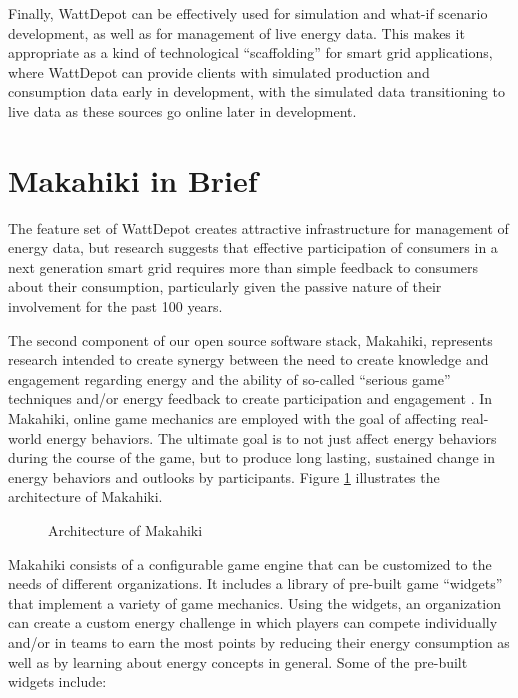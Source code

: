 \documentclass{acm_proc_article-sp}
\begin{document}
Finally, WattDepot can be effectively used for simulation and what-if scenario
development, as well as for management of live energy data.  This makes it appropriate as
a kind of technological ``scaffolding'' for smart grid applications, where WattDepot can
provide clients with simulated production and consumption data early in development, with
the simulated data transitioning to live data as these sources go online later in development.

\section{Makahiki in Brief}

The feature set of WattDepot creates attractive infrastructure for management of energy
data, but research suggests that effective participation of consumers in a next generation
smart grid requires more than simple feedback to consumers about their consumption,
particularly given the passive nature of their involvement for the past 100 years. 

The second component of our open source software stack, Makahiki, represents research
intended to create synergy between the need to create knowledge and engagement regarding
energy and the ability of so-called ``serious game'' techniques and/or energy feedback to
create participation and engagement \cite{Deterding2011mt,darby-review-2006,Faruqui09,petersen-dorm-energy-reduction}.
In Makahiki, online game mechanics are employed with the goal of affecting
real-world energy behaviors.  The ultimate goal is to not just affect energy behaviors
during the course of the game, but to produce long lasting, sustained change in energy
behaviors and outlooks by participants. Figure \ref{fig:makahiki-architecture} illustrates
the architecture of Makahiki.

\begin{figure}
\begin{center}
\end{center}
\caption{Architecture of Makahiki}
\label{fig:makahiki-architecture}
\end{figure}

Makahiki consists of a configurable game engine that can be customized to the needs of
different organizations.  It includes a library of pre-built game ``widgets'' that
implement a variety of game mechanics.  Using the widgets, an organization can create a
custom energy challenge in which players can compete individually and/or in teams to earn
the most points by reducing their energy consumption as well as by learning about energy
concepts in general.  Some of the pre-built widgets include:
\end{document}
